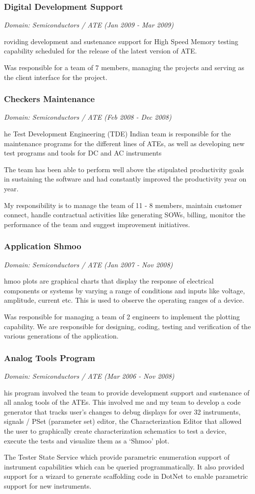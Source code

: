 \documentclass[a4paper,11pt]{article}
\newcommand\cvprojectentry[5]{
  \subsubsection*{#1}
  
  \vspace{-7pt}
  
  \it{Domain: #2}\normalfont{} \quad (#3 - #4)
  
}
\begin{document}
\begin{multicols}{2}
\cvprojectentry{Digital Development Support}{Semiconductors / ATE}{Jan 2009}{Mar 2009}
 
Providing development and sustenance support for High Speed Memory
testing capability scheduled for the release of the latest version of
ATE.
 
Was responsible for a team of 7 members, managing the projects and
serving as the client interface for the project.
 
\cvprojectentry{Checkers Maintenance}{Semiconductors / ATE}{Feb 2008}{Dec 2008}

The Test Development Engineering (TDE) Indian team is responsible for
the maintenance programs for the different lines of ATEs, as well as
developing new test programs and tools for DC and AC instruments

The team has been able to perform well above the stipulated
productivity goals in sustaining the software and had constantly
improved the productivity year on year.
 
My responsibility is to manage the team of 11 - 8 members, maintain
customer connect, handle contractual activities like generating SOWs,
billing, monitor the performance of the team and suggest improvement
initiatives.
 
\cvprojectentry{Application Shmoo}{Semiconductors / ATE}{Jan 2007}{Nov 2008}

Shmoo plots are graphical charts that display the response of
electrical components or systems by varying a range of conditions and
inputs like voltage, amplitude, current etc. This is used to observe
the operating ranges of a device.
 
Was responsible for managing a team of 2 engineers to implement the
plotting capability. We are responsible for designing, coding, testing
and verification of the various generations of the application.
 
\cvprojectentry{Analog Tools Program}{Semiconductors / ATE}{Mar 2006}{Nov 2008}

This program involved the team to provide development support and
sustenance of all analog tools of the ATEs. This involved me and my
team to develop a code generator that tracks user's changes to debug
displays for over 32 instruments, signals / PSet (parameter set)
editor, the Characterization Editor that allowed the user to
graphically create characterization schematics to test a device,
execute the tests and visualize them as a `Shmoo' plot.

The Tester State Service which provide parametric enumeration support
of instrument capabilities which can be queried programmatically. It
also provided support for a wizard to generate scaffolding code in
DotNet to enable parametric support for new instruments.
 

\end{multicols}
\end{document}
